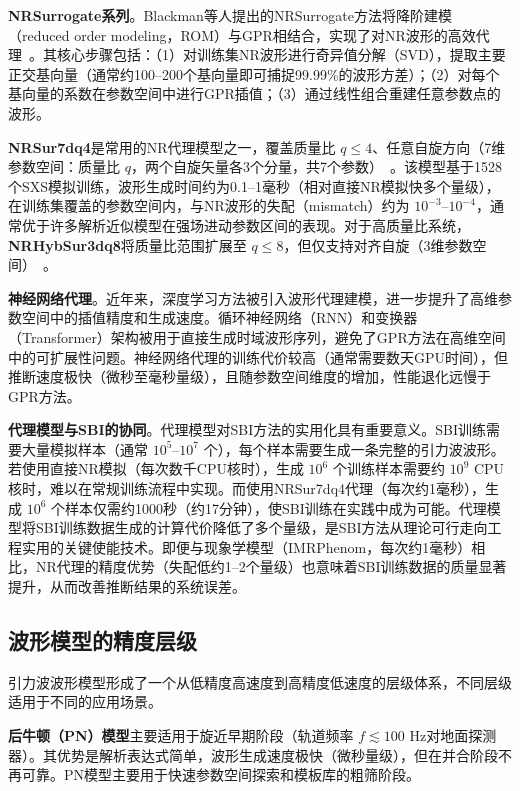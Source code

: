 \textbf{NRSurrogate系列}。Blackman等人提出的NRSurrogate方法将降阶建模（reduced order modeling，ROM）与GPR相结合，实现了对NR波形的高效代理~\cite{Blackman2017NRSur}。其核心步骤包括：（1）对训练集NR波形进行奇异值分解（SVD），提取主要正交基向量（通常约100--200个基向量即可捕捉99.99\%的波形方差）；（2）对每个基向量的系数在参数空间中进行GPR插值；（3）通过线性组合重建任意参数点的波形。

\textbf{NRSur7dq4}是常用的NR代理模型之一，覆盖质量比 $q \leq 4$、任意自旋方向（7维参数空间：质量比 $q$，两个自旋矢量各3个分量，共7个参数）~\cite{Varma2019NRSur7dq4}。该模型基于1528个SXS模拟训练，波形生成时间约为0.1--1毫秒（相对直接NR模拟快多个量级），在训练集覆盖的参数空间内，与NR波形的失配（mismatch）约为 $10^{-3}$--$10^{-4}$，通常优于许多解析近似模型在强场进动参数区间的表现。对于高质量比系统，\textbf{NRHybSur3dq8}将质量比范围扩展至 $q \leq 8$，但仅支持对齐自旋（3维参数空间）~\cite{Varma2019NRHybSur3dq8}。

\textbf{神经网络代理}。近年来，深度学习方法被引入波形代理建模，进一步提升了高维参数空间中的插值精度和生成速度。循环神经网络（RNN）和变换器（Transformer）架构被用于直接生成时域波形序列，避免了GPR方法在高维空间中的可扩展性问题。神经网络代理的训练代价较高（通常需要数天GPU时间），但推断速度极快（微秒至毫秒量级），且随参数空间维度的增加，性能退化远慢于GPR方法。

\textbf{代理模型与SBI的协同}。代理模型对SBI方法的实用化具有重要意义。SBI训练需要大量模拟样本（通常 $10^5$--$10^7$ 个），每个样本需要生成一条完整的引力波波形。若使用直接NR模拟（每次数千CPU核时），生成 $10^6$ 个训练样本需要约 $10^9$ CPU核时，难以在常规训练流程中实现。而使用NRSur7dq4代理（每次约1毫秒），生成 $10^6$ 个样本仅需约1000秒（约17分钟），使SBI训练在实践中成为可能。代理模型将SBI训练数据生成的计算代价降低了多个量级，是SBI方法从理论可行走向工程实用的关键使能技术。即便与现象学模型（IMRPhenom，每次约1毫秒）相比，NR代理的精度优势（失配低约1--2个量级）也意味着SBI训练数据的质量显著提升，从而改善推断结果的系统误差。

\subsection{波形模型的精度层级}

引力波波形模型形成了一个从低精度高速度到高精度低速度的层级体系，不同层级适用于不同的应用场景。

\textbf{后牛顿（PN）模型}主要适用于旋近早期阶段（轨道频率 $f \lesssim 100$ Hz对地面探测器）。其优势是解析表达式简单，波形生成速度极快（微秒量级），但在并合阶段不再可靠。PN模型主要用于快速参数空间探索和模板库的粗筛阶段。

